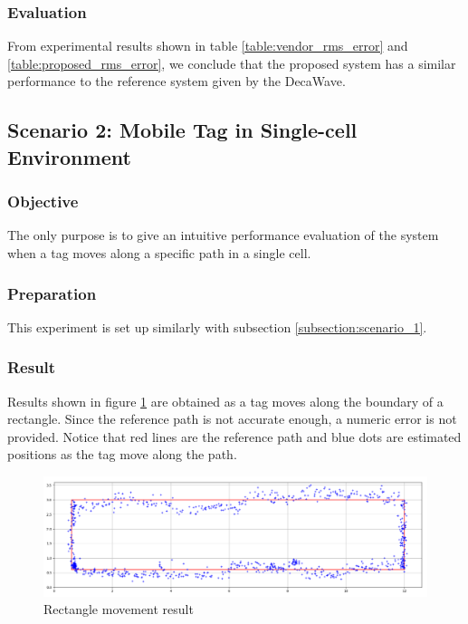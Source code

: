 \documentclass[\main/thesis.tex]{subfiles}
\begin{document}

\subsubsection{Evaluation}
From experimental results shown in table \ref{table:vendor_rms_error} and \ref{table:proposed_rms_error}, we conclude that the proposed system has a similar performance to the reference system given by the DecaWave.

\subsection{Scenario 2: Mobile Tag in Single-cell Environment}

\subsubsection{Objective}
The only purpose is to give an intuitive performance evaluation of the system when a tag moves along a specific path in a single cell.
\subsubsection{Preparation}
This experiment is set up similarly with subsection \ref{subsection:scenario_1}.
\subsubsection{Result}

Results shown in figure \ref{fig:result_rectangle} are obtained as a tag moves along the boundary of a rectangle. Since the reference path is not accurate enough, a numeric error is not provided. Notice that red lines are the reference path and blue dots are estimated positions as the tag move along the path.

\begin{figure}[H]
    \centering
    \includegraphics[width=1\textwidth]{result_square.png}
    \caption{Rectangle movement result}
    \label{fig:result_rectangle}
\end{figure}
\end{document}
